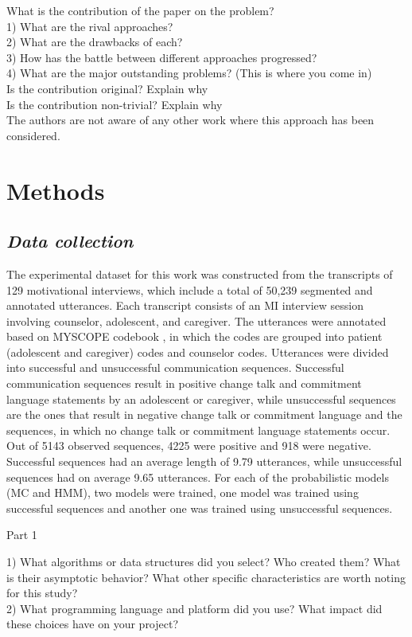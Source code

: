 \documentclass{amia}
\begin{document}
What is the contribution of the paper on the problem?\\
1) What are the rival approaches? \\
2) What are the drawbacks of each?\\
3) How has the battle between different approaches progressed?\\
4) What are the major outstanding problems? (This is where you come in)\\

Is the contribution original? Explain why \\

Is the contribution non-trivial? Explain why \\

The authors are not aware of any other work where this approach has been considered.

\section*{Methods}
\subsection*{\textit{Data collection}}
The experimental dataset for this work was constructed from the transcripts of 129 motivational interviews, which include a total of 50,239 segmented and annotated utterances. Each transcript consists
of an MI interview session involving counselor, adolescent, and caregiver. The utterances were annotated based on MYSCOPE codebook \cite{carcone2013provider}, in which the codes are grouped into
patient (adolescent and caregiver) codes and counselor codes. Utterances were divided into successful and unsuccessful communication sequences. Successful communication sequences result in
positive change talk and commitment language statements by an adolescent or caregiver, while unsuccessful sequences are the ones that result in negative change talk or commitment language and the
sequences, in which no change talk or commitment language statements occur. Out of 5143 observed sequences, 4225 were positive and 918 were negative. Successful sequences had an average length of
9.79 utterances, while unsuccessful sequences had on average 9.65 utterances. For each of the probabilistic models (MC and HMM), two models were trained, one model was trained using successful
sequences and another one was trained using unsuccessful sequences. 

Part 1

1) What algorithms or data structures did you select? Who created them? What is their asymptotic behavior? What other specific characteristics are worth noting for this study?\\
2) What programming language and platform did you use? What impact did these choices have on your project?\\
\end{document}
